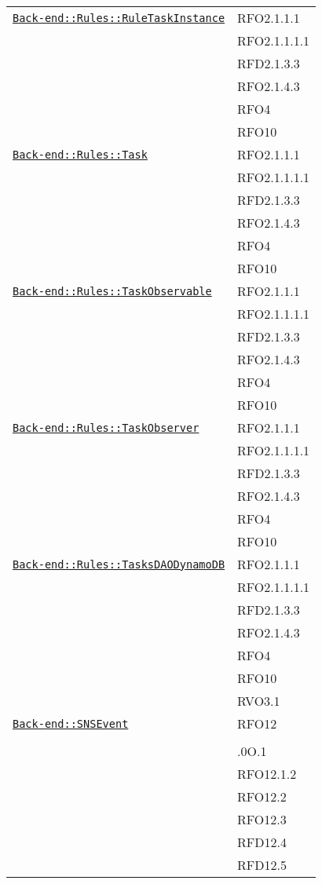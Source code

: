 \begin{longtable}{|>{\centering}m{10cm}|m{3cm}<{\centering}|}
\hyperref[Back-end::Rules::RuleTaskInstance]{\texttt{Back-end::Rules::RuleTaskInstance}} & RFO2.1.1.1\\
& RFO2.1.1.1.1\\
& RFD2.1.3.3\\
& RFO2.1.4.3\\
& RFO4\\
& RFO10\\ \hline

\hyperref[Back-end::Rules::Task]{\texttt{Back-end::Rules::Task}} & RFO2.1.1.1\\
& RFO2.1.1.1.1\\
& RFD2.1.3.3\\
& RFO2.1.4.3\\
& RFO4\\
& RFO10\\ \hline

\hyperref[Back-end::Rules::TaskObservable]{\texttt{Back-end::Rules::TaskObservable}} & RFO2.1.1.1\\
& RFO2.1.1.1.1\\
& RFD2.1.3.3\\
& RFO2.1.4.3\\
& RFO4\\
& RFO10\\ \hline

\hyperref[Back-end::Rules::TaskObserver]{\texttt{Back-end::Rules::TaskObserver}} & RFO2.1.1.1\\
& RFO2.1.1.1.1\\
& RFD2.1.3.3\\
& RFO2.1.4.3\\
& RFO4\\
& RFO10\\ \hline

\hyperref[Back-end::Rules::TasksDAODynamoDB]{\texttt{Back-end::Rules::TasksDAODynamoDB}} & RFO2.1.1.1\\
& RFO2.1.1.1.1\\
& RFD2.1.3.3\\
& RFO2.1.4.3\\
& RFO4\\
& RFO10\\
& RVO3.1\\ \hline

\hyperref[Back-end::SNSEvent]{\texttt{Back-end::SNSEvent}} & RFO12\\
& \\
& .0O.1\\
& RFO12.1.2\\
& RFO12.2\\
& RFO12.3\\
& RFD12.4\\
& RFD12.5\\ \hline


\end{longtable}
